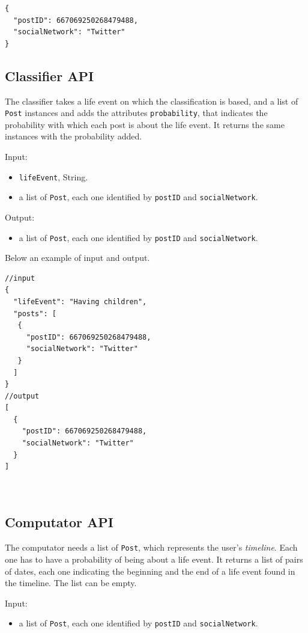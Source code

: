 \begin{Verbatim}
{
  "postID": 667069250268479488,
  "socialNetwork": "Twitter"
}
\end{Verbatim}

\subsection{Classifier API}
The classifier takes a life event on which the classification is based, and a list of \texttt{Post} instances and adds the attributes \texttt{probability}, that indicates the probability with which each post is about the life event. It returns the same instances with the probability added.

Input:
\begin{itemize}
\item \texttt{lifeEvent}, String.
\item a list of \texttt{Post}, each one identified by \texttt{postID} and \texttt{socialNetwork}.
\end{itemize}

Output:
\begin{itemize}
\item a list of \texttt{Post}, each one identified by \texttt{postID} and \texttt{socialNetwork}.
\end{itemize}

Below an example of input and output.
\begin{multicols}{2}
\begin{Verbatim}
//input
{
  "lifeEvent": "Having children",
  "posts": [
   {
     "postID": 667069250268479488,
     "socialNetwork": "Twitter"
   }
  ]
}
//output
[
  {
    "postID": 667069250268479488,
    "socialNetwork": "Twitter"
  }
]



\end{Verbatim}
\end{multicols}

\subsection{Computator API}
The computator needs a list of \texttt{Post}, which represents the user's \emph{timeline}. Each one has to have a probability of being about a life event. It returns a list of pairs of dates, each one indicating the beginning and the end of a life event found in the timeline. The list can be empty.

Input:
\begin{itemize}
\item a list of \texttt{Post}, each one identified by \texttt{postID} and \texttt{socialNetwork}.
\end{itemize}

